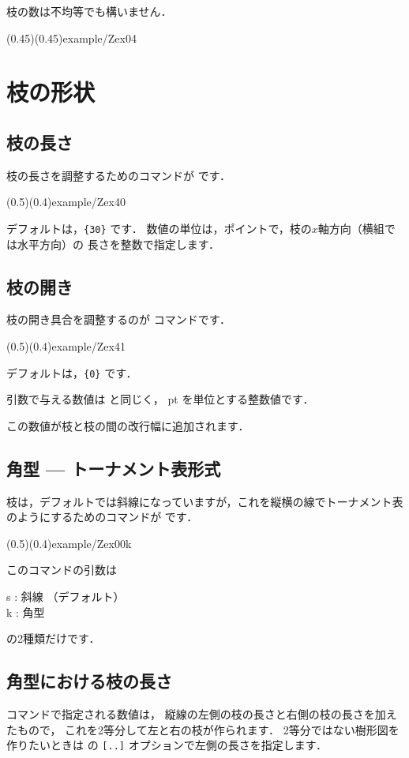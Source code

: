 \documentclass[a4j]{jarticle}
\begin{document}
枝の数は不均等でも構いません．

\showexample[不均等な分岐](0.45)(0.45){example/Zex04}
\clearpage

\section{枝の形状}
\subsection{枝の長さ}
枝の長さを調整するためのコマンドが  です．

{\showexample[枝の長さ](0.5)(0.4){example/Zex40}}

デフォルトは，\texttt{\{30\}} です．
数値の単位は，ポイントで，枝の$x$軸方向（横組では水平方向）の
長さを整数で指定します．
\clearpage

\subsection{枝の開き}
枝の開き具合を調整するのが  コマンドです．

{\showexample[枝の開き具合](0.5)(0.4){example/Zex41}}

デフォルトは，\texttt{\{0\}} です．

引数で与える数値は  と同じく，
pt を単位とする整数値です．

この数値が枝と枝の間の改行幅に追加されます．

\subsection{角型 --- トーナメント表形式}
枝は，デフォルトでは斜線になっていますが，これを縦横の線でトーナメント表
のようにするためのコマンドが  です．

{\showexample[角型樹形図](0.5)(0.4){example/Zex00k}}

このコマンドの引数は
\begin{jquote}
s : 斜線 （デフォルト）\\
k : 角型
\end{jquote}
の2種類だけです．
\clearpage

\subsection{角型における枝の長さ}
 コマンドで指定される数値は，
縦線の左側の枝の長さと右側の枝の長さを加えたもので，
これを2等分して左と右の枝が作られます．
2等分ではない樹形図を作りたいときは  の
\texttt{[..]} オプションで左側の長さを指定します．
\end{document}
